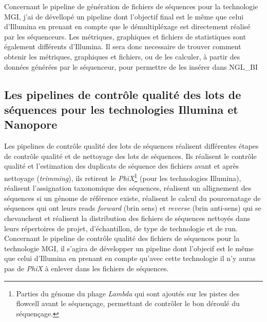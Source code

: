 Concernant le pipeline de génération de fichiers de séquences pour la technologie MGI, j'ai de dévellopé un pipeline dont l'objectif final est le même que celui d'Illumina en prenant en compte que le démultipléxage est directement réalisé par les séquenceurs. Les métriques, graphiques et fichiers de statistiques sont également différents d'Illumina. Il sera donc necessaire de trouver comment obtenir les métriques, graphiques et fichiers, ou de les calculer, à partir des données générées par le séquenceur, pour permettre de les insérer dans NGL\_BI

\subsection{Les pipelines de contrôle qualité des lots de séquences pour les technologies Illumina et Nanopore}
Les pipelines de contrôle qualité des lots de séquences réalisent différentes étapes de contrôle qualité et de nettoyage des lots de séquences. Ils réalisent le contrôle qualité et l'estimation des duplicats de séquence des fichiers avant et après nettoyage (\emph{trimming}), ils retirent le \emph{PhiX}\footnote{Parties du génome du phage \emph{Lambda} qui sont ajoutés sur les pistes des flowcell avant le séquençage, permettant de contrôler le bon déroulé du séquençage.} (pour les technologies Illumina), réalisent l'assignation taxonomique des séquences, réalisent un allignement des séquences si un génome de référence existe, réalisent le calcul du pourcenatage de séquences qui ont leurs reads \emph{forward} (brin sens) et \emph{reverse} (brin anti-sens) qui se chevauchent et réalisent la distribution des fichiers de séquences nettoyés dans leurs répertoires de projet, d'échantillon, de type de technologie et de run.\\

Concernant le pipeline de contrôle qualité des fichiers de séquences pour la technologie MGI, il s'agira de développer un pipeline dont l'objecif est le même que celui d'Illumina en prenant en compte qu'avec cette technologie il n'y auras pas de \emph{PhiX} à enlever dans les fichiers de séquences.
